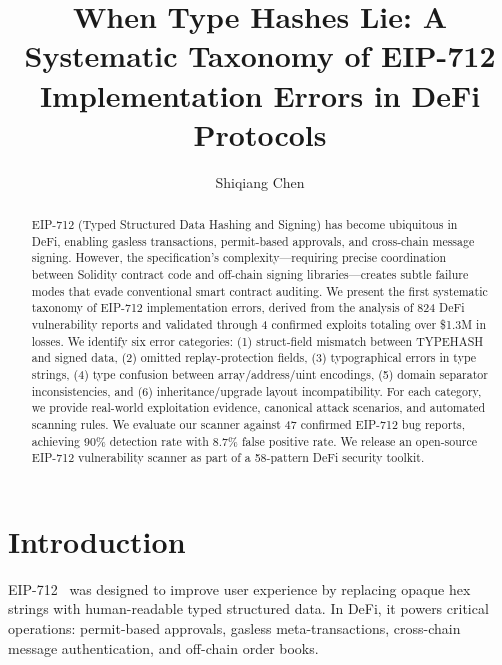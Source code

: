 \documentclass[runningheads]{llncs}
\begin{document}
\title{When Type Hashes Lie: A Systematic Taxonomy of EIP-712 Implementation Errors in DeFi Protocols}

\author{Shiqiang Chen}


\maketitle

\begin{abstract}
EIP-712 (Typed Structured Data Hashing and Signing) has become ubiquitous in DeFi, enabling gasless transactions, permit-based approvals, and cross-chain message signing. However, the specification's complexity---requiring precise coordination between Solidity contract code and off-chain signing libraries---creates subtle failure modes that evade conventional smart contract auditing. We present the first systematic taxonomy of EIP-712 implementation errors, derived from the analysis of 824 DeFi vulnerability reports and validated through 4 confirmed exploits totaling over \$1.3M in losses. We identify six error categories: (1) struct-field mismatch between TYPEHASH and signed data, (2) omitted replay-protection fields, (3) typographical errors in type strings, (4) type confusion between array/address/uint encodings, (5) domain separator inconsistencies, and (6) inheritance/upgrade layout incompatibility. For each category, we provide real-world exploitation evidence, canonical attack scenarios, and automated scanning rules. We evaluate our scanner against 47 confirmed EIP-712 bug reports, achieving 90\% detection rate with 8.7\% false positive rate. We release an open-source EIP-712 vulnerability scanner as part of a 58-pattern DeFi security toolkit.

\end{abstract}

\section{Introduction}

EIP-712~\cite{eip712} was designed to improve user experience by replacing opaque hex strings with human-readable typed structured data. In DeFi, it powers critical operations: permit-based approvals, gasless meta-transactions, cross-chain message authentication, and off-chain order books.
\end{document}
